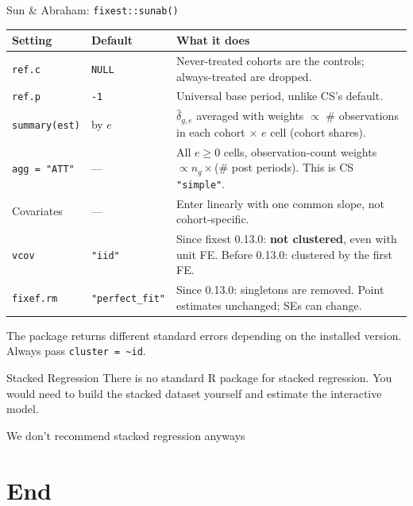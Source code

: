 \documentclass[11pt]{beamer}
\begin{document}
\begin{frame}[fragile]{Sun \& Abraham: \texttt{fixest::sunab()}}
\scriptsize
\setlength{\tabcolsep}{3pt}
\begin{tabular}{L{2.2cm} L{2.4cm} L{6.8cm}}
\toprule
Setting & Default & What it does \\
\midrule
\verb|ref.c| & \verb|NULL| & Never-treated cohorts are the controls; always-treated are dropped. \\
\verb|ref.p| & \verb|-1| & Universal base period, unlike CS's default. \\
\verb|summary(est)| & by $e$ & $\hat\delta_{g,e}$ averaged with weights $\propto$ \# observations in each cohort $\times$ $e$ cell (cohort shares). \\
\verb|agg = "ATT"| & --- & All $e\ge 0$ cells, observation-count weights $\propto n_g\times$(\# post periods). This is CS \verb|"simple"|. \\
Covariates & --- & Enter linearly with one common slope, not cohort-specific. \\
\verb|vcov| & \verb|"iid"| & Since fixest 0.13.0: \textbf{not clustered}, even with unit FE. Before 0.13.0: clustered by the first FE. \\
\verb|fixef.rm| & \verb|"perfect_fit"| & Since 0.13.0: singletons are removed. Point estimates unchanged; SEs can change. \\
\bottomrule
\end{tabular}

\vspace{0.6em}
\footnotesize
The package returns different standard errors depending on the installed version. Always pass \verb|cluster = ~id|.
\end{frame}

\begin{frame}{Stacked Regression}
    There is no standard R package for stacked regression. You would need to build the stacked dataset yourself and estimate the interactive model.

    \footnotesize
    \vspace{5mm}

    We don't recommend stacked regression anyways
\end{frame}


\section{End}
\end{document}
